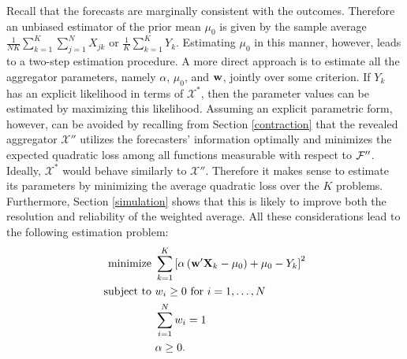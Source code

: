 \documentclass[11pt]{article}
\newcommand{\UNIT}{\text{UNIT}}
\newcommand{\R}{\mathbb{R}}
\DeclareMathOperator*{\argmin}{arg\,min}
\theoremstyle{definition}
\theoremstyle{definition}
\def\bSigma{{\bf \Sigma}}
\def\w{{\bf w}}
\def\X{{\bf X}}
\def\F{{\cal F}}
\begin{document}
Recall that the forecasts are marginally consistent with the outcomes. Therefore an unbiased estimator of the prior mean $\mu_0$ is given by the sample average $\frac{1}{NK} \sum_{k=1}^K\sum_{j=1}^N X_{jk}$ or $\frac{1}{K} \sum_{k=1}^K Y_k$. Estimating $\mu_0$ in this manner, however, leads to a two-step estimation procedure. A more direct approach is to estimate all the aggregator parameters, namely $\alpha$, $\mu_0$, and $\w$, jointly over some criterion. If $Y_k$ has an explicit likelihood in terms of $\mathcal{X}^*$, then the parameter values can be estimated by maximizing this likelihood. Assuming an explicit parametric form, however, can be avoided by recalling from Section \ref{contraction} that the revealed aggregator $\mathcal{X}''$ utilizes the forecasters' information optimally and minimizes the expected quadratic loss among all functions measurable with respect to $\F''$. Ideally, $\mathcal{X}^*$ would behave similarly to $\mathcal{X}''$. Therefore it makes sense to estimate its parameters by minimizing the average quadratic loss over the $K$ problems. Furthermore, Section \ref{simulation} shows that this is likely to improve both the resolution and reliability of the weighted average. All these considerations lead to the following estimation problem:
\begin{align}
 \label{firstProblem}
 \begin{split}
\text{minimize } & \sum_{k=1}^K \left[ \alpha  \left(  \w'\X_{k} - \mu_0\right) + \mu_0 - Y_k \right]^2\\
\text{subject to } & w_i \geq 0 \text{ for } i = 1, \dots, N\\
& \sum_{i=1}^N w_i = 1\\
& \alpha \geq 0.
\end{split}
\end{align}
\end{document}
